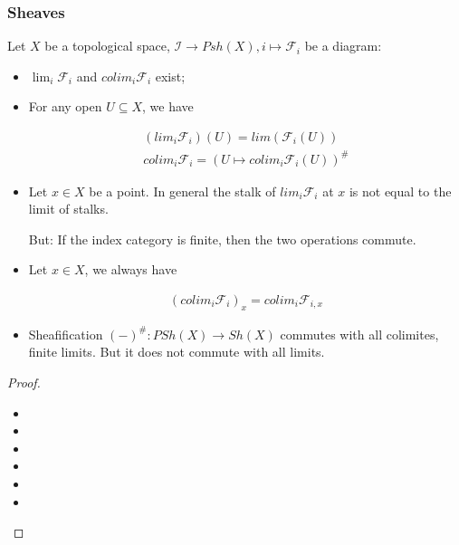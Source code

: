 \documentclass[Total.tex]{subfiles}
\begin{document}
				\subsubsection{Sheaves}
				\begin{lemma}
					Let $X$ be a topological space, $\mathcal{I}\rightarrow Psh(X),i\mapsto \mathcal{F}_i$ be a diagram:
					
					\begin{itemize}
						\item $\lim_{i} \mathcal{F}_i$ and $colim_{i} \mathcal{F}_i$ exist;
						\item For any open $U\subseteq X$, we have
						
						\begin{gather*}
							(lim_{i}\mathcal{F}_i)(U)=lim(\mathcal{F}_i(U))\\
							colim_i\mathcal{F}_i=(U\mapsto colim_i \mathcal{F}_i(U))^\#
						\end{gather*}
						\item Let $x\in X$ be a point. In general the stalk of $lim_i\mathcal F_i$ at $x$ is not equal to the limit of stalks.
						
						But: If the index category is finite, then the two operations commute.
						\item Let $x\in X$, we always have
						
						\begin{gather*}
							(colim_i \mathcal{F}_i)_x=colim_i \mathcal{F}_{i,x}
						\end{gather*}
						\item Sheafification $(-)^\#:PSh(X)\rightarrow Sh(X)$ commutes with all colimites, finite limits. But it does not commute with all limits.
					\end{itemize}
				\end{lemma}
				\begin{proof}
					\begin{itemize}
						\item 
						\item 
						\item 
						\item 
						\item 
						\item 
					\end{itemize}
				\end{proof}
				
\end{document}
